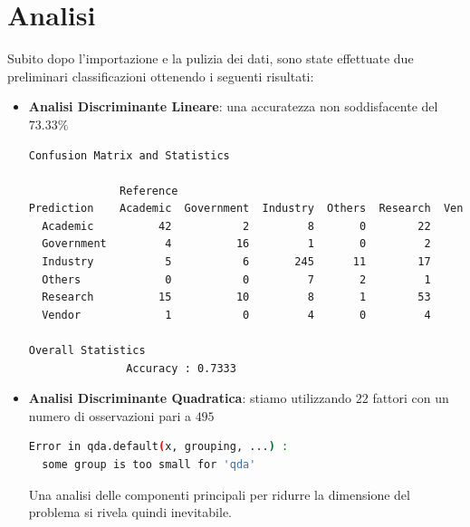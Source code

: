 \documentclass[11pt,a4paper]{article}
\begin{document}
\section{Analisi}
Subito dopo l'importazione e la pulizia dei dati, sono state effettuate due
preliminari classificazioni ottenendo i seguenti risultati:
\begin{itemize}
	\item \textbf{Analisi Discriminante Lineare}: una accuratezza non
		soddisfacente del $73.33\%$
	\begin{lstlisting}[language=bash,basicstyle=\scriptsize,tabsize=2,frame = single]
Confusion Matrix and Statistics

              Reference
Prediction    Academic  Government  Industry  Others  Research  Vendor
  Academic          42           2         8       0        22       2
  Government         4          16         1       0         2       0
  Industry           5           6       245      11        17       0
  Others             0           0         7       2         1       0
  Research          15          10         8       1        53       1
  Vendor             1           0         4       0         4       5

Overall Statistics
               Accuracy : 0.7333
	\end{lstlisting}
	\item \textbf{Analisi Discriminante Quadratica}: stiamo utilizzando $22$
		fattori con un numero di osservazioni pari a $495$
	\begin{lstlisting}[language=bash,basicstyle=\scriptsize,tabsize=2,frame = single]
Error in qda.default(x, grouping, ...) : 
  some group is too small for 'qda'
	\end{lstlisting}
		Una analisi delle componenti principali per ridurre la
		dimensione del problema si rivela quindi inevitabile.
\end{itemize}
\end{document}
